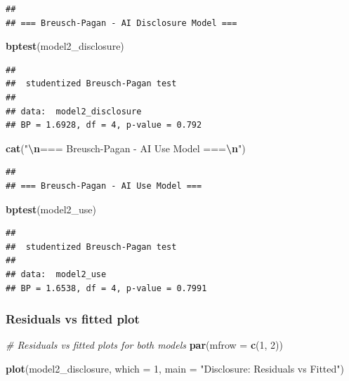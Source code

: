 \documentclass[
]{article}
\newenvironment{Shaded}{\begin{snugshade}}{\end{snugshade}}
\newcommand{\AttributeTok}[1]{\textcolor[rgb]{0.13,0.29,0.53}{#1}}
\newcommand{\CommentTok}[1]{\textcolor[rgb]{0.56,0.35,0.01}{\textit{#1}}}
\newcommand{\DecValTok}[1]{\textcolor[rgb]{0.00,0.00,0.81}{#1}}
\newcommand{\FunctionTok}[1]{\textcolor[rgb]{0.13,0.29,0.53}{\textbf{#1}}}
\newcommand{\NormalTok}[1]{#1}
\newcommand{\SpecialCharTok}[1]{\textcolor[rgb]{0.81,0.36,0.00}{\textbf{#1}}}
\newcommand{\StringTok}[1]{\textcolor[rgb]{0.31,0.60,0.02}{#1}}
\begin{document}
\begin{verbatim}
## 
## === Breusch-Pagan - AI Disclosure Model ===
\end{verbatim}

\begin{Shaded}
\begin{Highlighting}[]
\FunctionTok{bptest}\NormalTok{(model2\_disclosure)}
\end{Highlighting}
\end{Shaded}

\begin{verbatim}
## 
##  studentized Breusch-Pagan test
## 
## data:  model2_disclosure
## BP = 1.6928, df = 4, p-value = 0.792
\end{verbatim}

\begin{Shaded}
\begin{Highlighting}[]
\FunctionTok{cat}\NormalTok{(}\StringTok{"}\SpecialCharTok{\textbackslash{}n}\StringTok{=== Breusch{-}Pagan {-} AI Use Model ===}\SpecialCharTok{\textbackslash{}n}\StringTok{"}\NormalTok{)}
\end{Highlighting}
\end{Shaded}

\begin{verbatim}
## 
## === Breusch-Pagan - AI Use Model ===
\end{verbatim}

\begin{Shaded}
\begin{Highlighting}[]
\FunctionTok{bptest}\NormalTok{(model2\_use)}
\end{Highlighting}
\end{Shaded}

\begin{verbatim}
## 
##  studentized Breusch-Pagan test
## 
## data:  model2_use
## BP = 1.6538, df = 4, p-value = 0.7991
\end{verbatim}

\subsubsection{Residuals vs fitted plot}\label{residuals-vs-fitted-plot}

\begin{Shaded}
\begin{Highlighting}[]
\CommentTok{\# Residuals vs fitted plots for both models}
\FunctionTok{par}\NormalTok{(}\AttributeTok{mfrow =} \FunctionTok{c}\NormalTok{(}\DecValTok{1}\NormalTok{, }\DecValTok{2}\NormalTok{))}

\FunctionTok{plot}\NormalTok{(model2\_disclosure, }\AttributeTok{which =} \DecValTok{1}\NormalTok{, }
     \AttributeTok{main =} \StringTok{"Disclosure: Residuals vs Fitted"}\NormalTok{)}
\end{Highlighting}
\end{Shaded}
\end{document}

